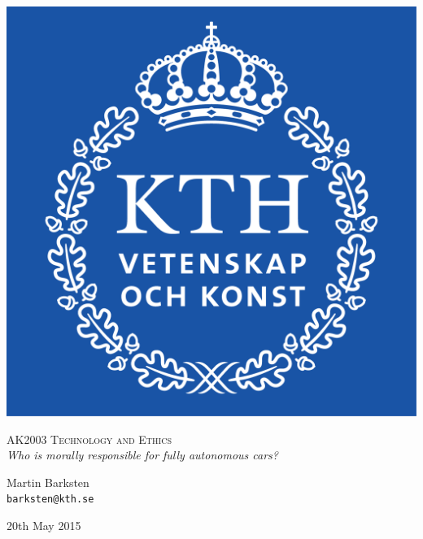 \begin{titlepage}
\begin{center}
    \includegraphics[scale=0.4]{Images/KTH_Logotyp.png}
    \vspace{2cm}

    \textsc{\LARGE AK2003 Technology and Ethics}\\[0.2cm]
    \Large \textit{Who is morally responsible for fully autonomous cars?}\\[0.3cm]

    \noindent
    \begin{table}[h!]
        \centering
        \large
        Martin Barksten\\
        \texttt{barksten@kth.se}
    \end{table}

    \vfill
    
    {\large 20th May 2015} %

\end{center}
\end{titlepage}